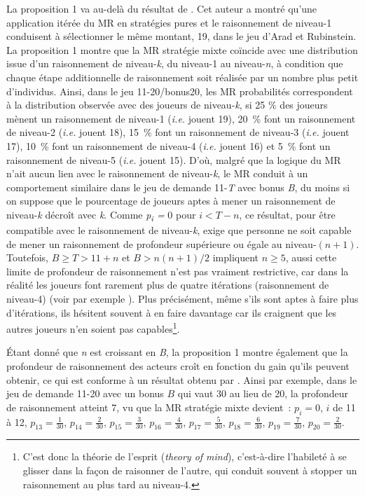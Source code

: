 \begin{Article}
\begin{refsection}[UmbhauerFR]
La proposition 1 va au-delà du résultat de \textcite{garciapola2020}. Cet auteur a montré qu'une application itérée du MR en
stratégies pures et le raisonnement de niveau-1 conduisent à
sélectionner le même montant, 19, dans le jeu d'Arad et Rubinstein. La
proposition 1 montre que la MR stratégie mixte coïncide avec une
distribution issue d'un raisonnement de niveau-\emph{k}, du niveau-1 au
niveau-\emph{n}, à condition que chaque étape additionnelle de
raisonnement soit réalisée par un nombre plus petit d'individus. Ainsi,
dans le jeu 11-20/bonus20, les MR probabilités correspondent à la
distribution observée avec des joueurs de niveau-\emph{k}, si 25 \% des
joueurs mènent un raisonnement de niveau-1 (\emph{i.e.} jouent 19), 20~\% font
un raisonnement de niveau-2 (\emph{i.e.} jouent 18), 15~\% font un raisonnement
de niveau-3 (\emph{i.e.} jouent 17), 10~\% font un raisonnement de niveau-4
(\emph{i.e.} jouent 16) et 5~\% font un raisonnement de niveau-5 (\emph{i.e.} jouent
15). D'où, malgré que la logique du MR n'ait aucun lien avec le
raisonnement de niveau-\emph{k}, le MR conduit à un comportement
similaire dans le jeu de demande 11-\emph{T} avec bonus \emph{B}, du
moins si on suppose que le pourcentage de joueurs aptes à mener un
raisonnement de niveau-\emph{k} décroît avec \emph{k}. Comme
\emph{p\textsubscript{i} =} 0 pour \(i < T - n\), ce résultat, pour être
compatible avec le raisonnement de niveau-\emph{k}, exige que personne
ne soit capable de mener un raisonnement de profondeur supérieure ou
égale au niveau-\((n + 1)\). Toutefois, \(B \geq T > 11 + n\) et
\(B > n(n + 1)/2\) impliquent \(n \geq 5\), aussi cette limite de
profondeur de raisonnement n'est pas vraiment restrictive, car dans la
réalité les joueurs font rarement plus de quatre itérations (raisonnement de
niveau-4) (voir par exemple \textcite{crawford2013}). Plus précisément, même
s'ils sont aptes à faire plus d'itérations, ils hésitent souvent à en
faire davantage car ils craignent que les autres joueurs n'en soient pas
capables\footnote{C'est donc la théorie de l'esprit (\textit{theory of mind}),
  c'est-à-dire l'habileté à se glisser dans la façon de raisonner de
  l'autre, qui conduit souvent à stopper un raisonnement au plus tard au
  niveau-4.}.

Étant donné que \emph{n} est croissant en \emph{B}, la proposition 1
montre également que la profondeur de raisonnement des acteurs croît en
fonction du gain qu'ils peuvent obtenir, ce qui est conforme à un
résultat obtenu par \textcite{alaoui2016}. Ainsi par exemple, dans
le jeu de demande 11-20 avec un bonus \(B\) qui vaut 30 au lieu de 20,
la profondeur de raisonnement atteint 7, vu que la MR stratégie mixte
devient~: $p_{i} = 0$, $i$ de 11 à 12, $p_{13} = \frac{1}{30}$, $p_{14} = \frac{2}{30}$, $p_{15} = \frac{3}{30}$, $p_{16} = \frac{4}{30}$, $p_{17} = \frac{5}{30}$, $p_{18} = \frac{6}{30}$, $p_{19} = \frac{7}{30}$, $p_{20} = \frac{2}{30}$.



\end{refsection}
\end{Article}

